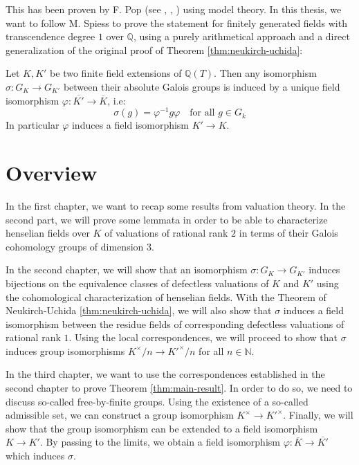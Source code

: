 This has been proven by F. Pop (see \cite{Po90}, \cite{Po94}, \cite{Po95}) using model theory. In this thesis, we want to follow M. Spiess \cite{Sp96} to prove the statement for finitely generated fields with transcendence degree $1$ over $\mathbb{Q}$, using a purely arithmetical approach and a direct generalization of the original proof of Theorem \ref{thm:neukirch-uchida}:

\pagebreak

\begin{theorem}\label{thm:main-result}
Let $K,K'$ be two finite field extensions of $\mathbb{Q}(T)$. Then any isomorphism $\sigma:G_K\to G_{K'}$ between their absolute Galois groups is induced by a unique field isomorphism $\varphi:\overline{K'}\to\overline{K}$, i.e: 
\[\sigma(g) =\varphi^{-1}g\varphi \quad \text{for all }g\in G_k\]
In particular $\varphi$ induces a field isomorphism $K'\to K$.
\end{theorem}

\section{Overview}

In the first chapter, we want to recap some results from valuation theory. In the second part, we will prove some lemmata in order to be able to characterize henselian fields over $K$ of valuations of rational rank $2$ in terms of their Galois cohomology groups of dimension $3$.

In the second chapter, we will show that an isomorphism $\sigma: G_K\to G_{K'}$ induces bijections on the equivalence classes of defectless valuations of $K$ and $K'$ using the cohomological characterization of henselian fields. With the Theorem of Neukirch-Uchida \ref{thm:neukirch-uchida}, we will also show that $\sigma$ induces a field isomorphism between the residue fields of corresponding defectless valuations of rational rank $1$. Using the local correspondences, we will proceed to show that $\sigma$ induces group isomorphisms $K^\times/n\to K'^\times/n$ for all $n\in\mathbb{N}$.

In the third chapter, we want to use the correspondences established in the second chapter to prove Theorem \ref{thm:main-result}. In order to do so, we need to discuss so-called free-by-finite groups. Using the existence of a so-called admissible set, we can construct a group isomorphism $K^\times\to K'^\times$. Finally, we will show that the group isomorphism can be extended to a field isomorphism $K\to K'$. By passing to the limits, we obtain a field isomorphism $\varphi: \overline{K}\to\overline{K'}$ which induces $\sigma$.

